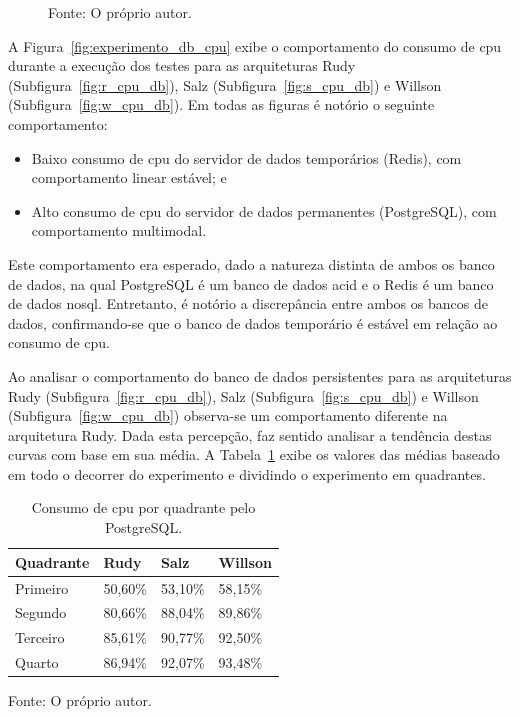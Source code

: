 \begin{figure}[htb!]
    Fonte: O próprio autor.
\end{figure}


A Figura~\ref{fig:experimento_db_cpu} exibe o comportamento do consumo de \ac{cpu} durante a execução dos testes para as arquiteturas Rudy (Subfigura~\ref{fig:r_cpu_db}), Salz (Subfigura~\ref{fig:s_cpu_db}) e Willson (Subfigura~\ref{fig:w_cpu_db}).
%
Em todas as figuras é notório o seguinte comportamento:

\begin{itemize}
 \item Baixo consumo de \ac{cpu} do servidor de dados temporários (Redis), com comportamento linear estável; e
 \item Alto consumo de \ac{cpu} do servidor de dados permanentes (PostgreSQL), com comportamento multimodal.
\end{itemize}

Este comportamento era esperado, dado a natureza distinta de ambos os banco de dados, na qual PostgreSQL é um banco de dados \ac{acid} e o Redis é um banco de dados \ac{nosql}.
%
Entretanto, é notório a discrepância entre ambos os bancos de dados,
confirmando-se que o banco de dados temporário é estável em relação ao consumo de \ac{cpu}.

Ao analisar o comportamento do banco de dados persistentes para as arquiteturas Rudy (Subfigura~\ref{fig:r_cpu_db}), Salz (Subfigura~\ref{fig:s_cpu_db}) e Willson (Subfigura~\ref{fig:w_cpu_db}) observa-se um comportamento diferente na arquitetura Rudy.
%
Dada esta percepção, faz sentido analisar a tendência destas curvas com base em sua média.
%
A Tabela~\ref{tab:cpu_db_media_quadrantes} exibe os valores das médias baseado em todo o decorrer do experimento e dividindo o experimento em quadrantes.

\begin{table}[htb!]
\centering
\begin{adjustbox}{max width=\textwidth}
\caption{Consumo de \ac{cpu} por quadrante pelo PostgreSQL.}
\label{tab:cpu_db_media_quadrantes}
\begin{tabular}{l|l|l|l}

\hline \hline

Quadrante & Rudy    & Salz    & Willson \\ \hline \hline

Primeiro  & 50,60\% & 53,10\% & 58,15\% \\ \hline

Segundo   & 80,66\% & 88,04\% & 89,86\% \\ \hline

Terceiro  & 85,61\% & 90,77\% & 92,50\% \\ \hline

Quarto    & 86,94\% & 92,07\% & 93,48\% \\ \hline \hline

\end{tabular}

\end{adjustbox}

Fonte: O próprio autor.
\end{table}

